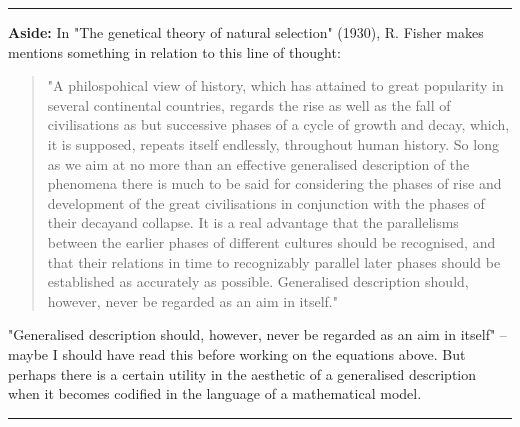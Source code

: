 \vspace{10pt}

\hrule

\vspace{10pt}



\noindent
\textbf{Aside:} In "The genetical theory of natural selection" (1930),  R.  Fisher makes mentions something in relation to this line of thought: 

\begin{quote}
\noindent
"A philospohical view of history, which has attained to great popularity in several continental countries,  regards the rise as well as the fall of civilisations as but successive phases of a cycle of growth and decay,  which, it is supposed, repeats itself endlessly,  throughout human history.  So long as we aim at no more than an effective generalised description of the phenomena there is much to be said for considering the phases of rise and development of the great civilisations in conjunction with the phases of their decayand collapse. It is a real advantage that the parallelisms between the earlier phases of different cultures should be recognised, and that their relations in time to recognizably parallel later phases should be established as accurately as possible.  Generalised description should, however,  never be regarded as an aim in itself."
\end{quote}

"Generalised description should, however,  never be regarded as an aim in itself" -- maybe I should have read this before working on the equations above.  But perhaps there is a certain utility in the aesthetic of a generalised description when it becomes codified in the language of a mathematical model. 




\vspace{10pt}

\hrule


\vspace{10pt}
